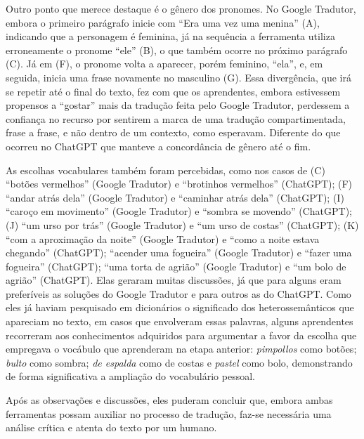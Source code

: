 \documentclass[portuguese]{textolivre}
\begin{document}
Outro ponto que merece destaque é o gênero dos pronomes. No Google Tradutor, embora o primeiro parágrafo inicie com “Era uma vez uma menina” (A), indicando que a personagem é feminina, já na sequência a ferramenta utiliza erroneamente o pronome “ele” (B), o que também ocorre no próximo parágrafo (C). Já em (F), o pronome volta a aparecer, porém feminino, “ela”, e, em seguida, inicia uma frase novamente no masculino (G). Essa divergência, que irá se repetir até o final do texto, fez com que os aprendentes, embora estivessem propensos a “gostar” mais da tradução feita pelo Google Tradutor, perdessem a confiança no recurso por sentirem a marca de uma tradução compartimentada, frase a frase, e não dentro de um contexto, como esperavam. Diferente do que ocorreu no ChatGPT que manteve a concordância de gênero até o fim.

As escolhas vocabulares também foram percebidas, como nos casos de (C) “botões vermelhos” (Google Tradutor) e “brotinhos vermelhos” (ChatGPT); (F) “andar atrás dela” (Google Tradutor) e “caminhar atrás dela” (ChatGPT); (I) “caroço em movimento” (Google Tradutor) e “sombra se movendo” (ChatGPT); (J) “um urso por trás” (Google Tradutor) e “um urso de costas” (ChatGPT); (K) “com a aproximação da noite” (Google Tradutor) e “como a noite estava chegando” (ChatGPT); “acender uma fogueira” (Google Tradutor) e “fazer uma fogueira” (ChatGPT); “uma torta de agrião” (Google Tradutor) e “um bolo de agrião” (ChatGPT). Elas geraram muitas discussões, já que para alguns eram preferíveis as soluções do Google Tradutor e para outros as do ChatGPT. Como eles já haviam pesquisado em dicionários o significado dos heterossemânticos que apareciam no texto, em casos que envolveram essas palavras, alguns aprendentes recorreram aos conhecimentos adquiridos para argumentar a favor da escolha que empregava o vocábulo que aprenderam na etapa anterior: \textit{pimpollos} como botões; \textit{bulto} como sombra; \textit{de espalda} como de costas e \textit{pastel} como bolo, demonstrando de forma significativa a ampliação do vocabulário pessoal.

Após as observações e discussões, eles puderam concluir que, embora ambas ferramentas possam auxiliar no processo de tradução, faz-se necessária uma análise crítica e atenta do texto por um humano.
\end{document}
